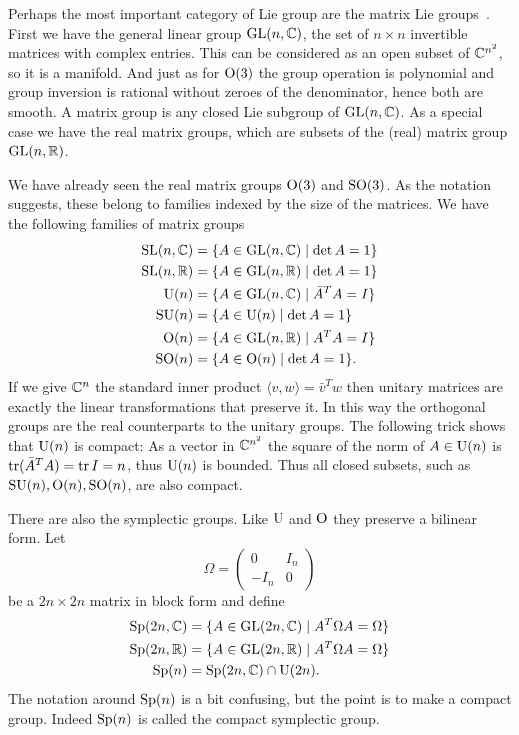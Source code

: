 Perhaps the most important category of Lie group are the matrix Lie groups~\cite[Definition~1.4]{Hall2015}.
First we have the general linear group $\mathrm{GL}(n,\mathbb{C})$, the set of $n\times n$ invertible matrices with complex entries.
This can be considered as an open subset of $\mathbb{C}^{n^2}$, so it is a manifold. And just as for $\mathrm{O}(3)$ the group operation is polynomial and group inversion is rational without zeroes of the denominator, hence both are smooth.
A matrix group is any closed Lie subgroup of $\mathrm{GL}(n,\mathbb{C})$.
As a special case we have the real matrix groups, which are subsets of the (real) matrix group $\mathrm{GL}(n,\mathbb{R})$.

We have already seen the real matrix groups $\mathrm{O}(3)$ and $\mathrm{SO}(3)$.
As the notation suggests, these belong to families indexed by the size of the matrices.
We have the following families of matrix groups
\begin{align*}
\mathrm{SL}(n,\mathbb{C}) &= \{ A \in \mathrm{GL}(n,\mathbb{C}) \mid \det A = 1 \} \\
\mathrm{SL}(n,\mathbb{R}) &= \{ A \in \mathrm{GL}(n,\mathbb{R}) \mid \det A = 1 \} \\
\mathrm{U}(n) &= \{ A \in \mathrm{GL}(n,\mathbb{C}) \mid \bar{A}^T A = I \} \\
\mathrm{SU}(n) &= \{ A \in \mathrm{U}(n) \mid \det A = 1 \} \\
\mathrm{O}(n) &= \{ A \in \mathrm{GL}(n,\mathbb{R}) \mid A^T A = I \} \\
\mathrm{SO}(n) &= \{ A \in \mathrm{O}(n) \mid \det A = 1 \}.
\end{align*}
If we give $\mathbb{C}^n$ the standard inner product $\langle v,w \rangle = \bar{v}^Tw$ then unitary matrices are exactly the linear transformations that preserve it.
In this way the orthogonal groups are the real counterparts to the unitary groups.
The following trick shows that $\mathrm{U}(n)$ is compact: As a vector in $\mathbb{C}^{n^2}$ the square of the norm of $A \in \mathrm{U}(n)$ is $\operatorname{tr}(\bar{A}^T A) = \operatorname{tr} I = n$, thus $\mathrm{U}(n)$ is bounded.
Thus all closed subsets, such as $\mathrm{SU}(n), \mathrm{O}(n),\mathrm{SO}(n)$, are also compact.

There are also the symplectic groups.
Like $\mathrm{U}$ and $\mathrm{O}$ they preserve a bilinear form.
Let 
\[
\Omega = \begin{pmatrix}
0 & I_n \\ - I_n & 0
\end{pmatrix}
\]
be a $2n\times 2n$ matrix in block form and define
\begin{align*}
\mathrm{Sp}(2n,\mathbb{C}) &= \{ A \in \mathrm{GL}(2n,\mathbb{C}) \mid A^T\Omega A = \Omega \} \\
\mathrm{Sp}(2n,\mathbb{R}) &= \{ A \in \mathrm{GL}(2n,\mathbb{R}) \mid A^T\Omega A = \Omega \} \\
\mathrm{Sp}(n) &= \mathrm{Sp}(2n,\mathbb{C}) \cap \mathrm{U}(2n).
\end{align*}
The notation around $\mathrm{Sp}(n)$ is a bit confusing, but the point is to make a compact group.
Indeed $\mathrm{Sp}(n)$ is called the compact symplectic group.

